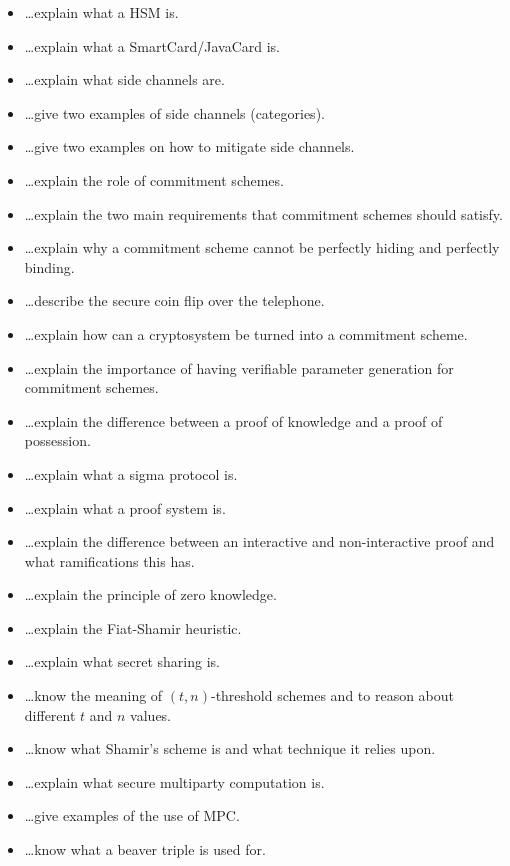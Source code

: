 \documentclass[usegeometry,parskip=half]{scrartcl}
\begin{document}
\begin{itemize}
  \item \dots{}explain what a HSM is.
  \item \dots{}explain what a SmartCard/JavaCard is.
  \item \dots{}explain what side channels are.
  \item \dots{}give two examples of side channels (categories).
  \item \dots{}give two examples on how to mitigate side channels.
  \item \dots{}explain the role of commitment schemes.
  \item \dots{}explain the two main requirements that commitment schemes should satisfy.
  \item \dots{}explain why a commitment scheme cannot be perfectly hiding and perfectly binding.
  \item \dots{}describe the secure coin flip over the telephone.
  \item \dots{}explain how can a cryptosystem be turned into a commitment scheme.
  \item \dots{}explain the importance of having verifiable parameter generation for commitment schemes.
  \item \dots{}explain the difference between a proof of knowledge and a proof of possession.
  \item \dots{}explain what a sigma protocol is.
  \item \dots{}explain what a proof system is.
  \item \dots{}explain the difference between an interactive and non-interactive proof and what ramifications this has.
  \item \dots{}explain the principle of zero knowledge.
  \item \dots{}explain the Fiat-Shamir heuristic.
  \item \dots{}explain what secret sharing is.
  \item \dots{}know the meaning of $(t, n)$-threshold schemes and to reason about different $t$ and $n$ values.
  \item \dots{}know what Shamir's scheme is and what technique it relies upon.
  \item \dots{}explain what secure multiparty computation is.
  \item \dots{}give examples of the use of MPC.
  \item \dots{}know what a beaver triple is used for.
\end{itemize}
\end{document}
